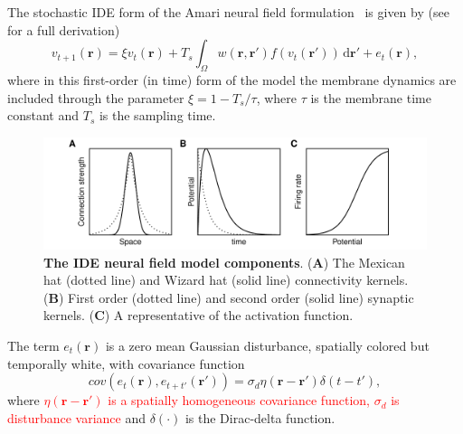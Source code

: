 \documentclass[review,authoryear,3p]{elsarticle}
\newcommand{\parham}[1]{\textcolor{red}{#1}}
\begin{document}
The stochastic IDE form of the Amari neural field formulation~\cite{Amari1977} is given by (see~\cite{Freestone2011} for a full derivation)
\begin{equation}\label{eq:DiscreteTimeModel}
	v_{t+1}\left(\mathbf{r}\right) = 
	\xi v_t\left(\mathbf{r}\right) + 
	T_s \int_\Omega { 
	    w\left(\mathbf{r},\mathbf{r'}\right)
	    f\left(v_t\left(\mathbf{r}'\right)\right) 
	\, \mathrm{d}\mathbf{r}'} 
	+ e_t\left(\mathbf{r}\right), 
\end{equation}
where in this first-order (in time) form of the model the membrane dynamics are included through the parameter $\xi=1-T_s/\tau$, where $\tau$ is the membrane time constant and $T_s$ is the sampling time. 
\begin{figure}[!t]
\centering
\includegraphics[scale=1]{./Graph/fig2.pdf}
\caption{ {\bf The IDE neural field model components}. (\textbf{A}) The Mexican hat (dotted line) and Wizard hat (solid line) connectivity kernels. (\textbf{B}) First order (dotted line) and second order (solid line) synaptic kernels. (\textbf{C}) A representative of the activation function.}
\label{fig:Modelcomponents}
\end{figure}

The term $e_t(\mathbf r)$ is a zero mean Gaussian disturbance, spatially colored but temporally white, with covariance function 
\begin{equation}
cov\left(e_{t}\left(\mathbf{r}\right),e_{t+t'}\left(\mathbf{r'}\right)\right)=\sigma_d\eta(\mathbf{r}-\mathbf{r'})\delta(t-t'),
\label{eq:FieldDisturbance}
\end{equation}
where \parham{$\eta(\mathbf{r}-\mathbf{r'})$ is a spatially homogeneous covariance function, $\sigma_d$ is disturbance variance} and $\delta(\cdot)$ is the Dirac-delta function. %
\end{document}
